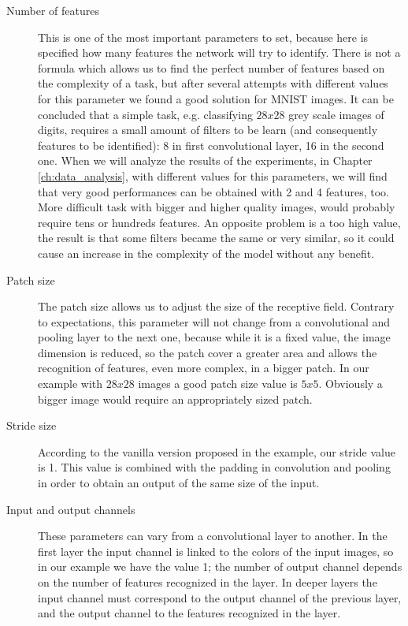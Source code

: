 \begin{description}
	
	\item[Number of features] This is one of the most important parameters to set, because here is specified how many features the network will try to identify. There is not a formula which allows us to find the perfect number of features based on the complexity of a task, but after several attempts with different values for this parameter we found a good solution for \acs{MNIST} images. It can be concluded that a simple task, e.g. classifying $28x28$ grey scale images of digits, requires a small amount of filters to be learn (and consequently features to be identified): 8 in first convolutional layer, 16 in the second one. When we will analyze the results of the experiments, in Chapter \ref{ch:data_analysis}, with different values for this parameters, we will find that very good performances can be obtained with 2 and 4 features, too. More difficult task with bigger and higher quality images, would probably require tens or hundreds features. An opposite problem is a too high value, the result is that some filters became the same or very similar, so it could cause an increase in the complexity of the model without any benefit.

	\item[Patch size] The patch size allows us to adjust the size of the receptive field. Contrary to expectations, this parameter will not change from a convolutional and pooling layer to the next one, because while it is a fixed value, the image dimension is reduced, so the patch cover a greater area and allows the recognition of features, even more complex, in a bigger patch.  In our example with $28x28$ images a good patch size value is $5x5$. Obviously a bigger image would require an appropriately sized patch.
	
	\item[Stride size] According to the vanilla version proposed in the example, our stride value is 1. This value is combined with the padding in convolution and pooling in order to obtain an output of the same size of the input.
	
	\item[Input and output channels] These parameters can vary from a convolutional layer to another. In the first layer the input channel is linked to the colors of the input images, so in our example we have the value 1; the number of output channel depends on the number of features recognized in the layer. In deeper layers the input channel must correspond to the output channel of the previous layer, and the output channel to the features recognized in the layer.
	

\end{description}
